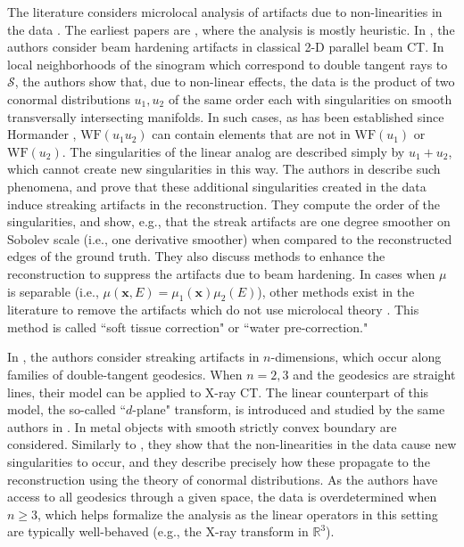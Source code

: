 \documentclass[11pt]{article}
\newcommand{\s}{\mathcal S}
\newcommand{\WF}{\mathrm{WF}}
\def\red#1{\textcolor[rgb]{1, 0, 0}{#1} }
\numberwithin{equation}{section}
\newcommand{\vx}{\mathbf{x}}
\theoremstyle{definition}
\begin{document}
The literature considers microlocal analysis of artifacts due to non-linearities in the data \cite{palacios2018quantitative, chihara2024geodesic, katsevich2026,palamodov1986nonlinear,palamodov1990some,park2017characterization,chihara2022microlocal, wang2024identification, wang2021streak}. 
{The earliest papers are \cite{palamodov1986nonlinear,palamodov1990some}, where the analysis is mostly heuristic.} In \cite{palacios2018quantitative}, the authors consider beam hardening artifacts in classical 2-D parallel beam CT. In local neighborhoods of the sinogram which correspond to double tangent rays to $\s$, the authors show that, due to non-linear effects, the data is the product of two conormal distributions $u_1, u_2$ of the same order each with singularities on smooth transversally intersecting manifolds. In such cases, as has been established since Hormander \cite[Theorem 8.2.10]{hor}, $\WF(u_1 u_2)$ can contain elements that are not in $\WF(u_1)$ or $\WF(u_2)$. The singularities of the linear analog are described simply by $u_1 + u_2$, which cannot create new singularities in this way. The authors in \cite{palacios2018quantitative} describe such phenomena, and prove that these additional singularities created in the data induce streaking artifacts in the reconstruction.  They compute the order of the singularities, and show, e.g., that the streak artifacts are one degree smoother on Sobolev scale (i.e., one derivative smoother) when compared to the reconstructed edges of the ground truth. They also discuss methods to enhance the reconstruction to suppress the artifacts due to beam hardening. In cases when $\mu$ is separable (i.e., $\mu(\vx,E) = \mu_1(\vx)\mu_2(E)$), other methods exist in the literature to remove the artifacts which do not use microlocal theory \cite{joseph1978method}. This method is called ``soft tissue correction" or ``water pre-correction." %

In \cite{chihara2024geodesic}, the authors consider streaking artifacts in $n$-dimensions, which occur along families of double-tangent geodesics. When $n=2,3$ and the geodesics are straight lines, their model can be applied to X-ray CT. The linear counterpart of this model, the so-called ``$d$-plane" transform, is introduced and studied by the same authors in \cite{chihara2022microlocal}. In \cite{chihara2024geodesic} metal objects with smooth strictly convex boundary are considered. Similarly to \cite{palacios2018quantitative}, they show that the non-linearities in the data cause new singularities to occur, and they describe precisely how these propagate to the reconstruction using the theory of conormal distributions. As the authors have access to all geodesics through a given space, the data is overdetermined when $n \geq 3$, which helps formalize the analysis as the linear operators in this setting are typically well-behaved (e.g., the X-ray transform in $\mathbb{R}^3$).
\end{document}
